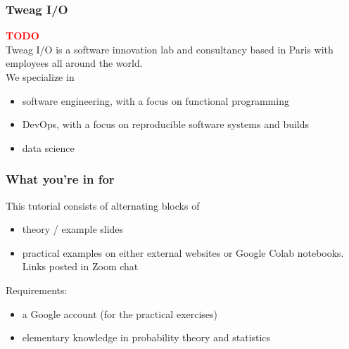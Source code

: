 \documentclass[t,aspectratio=169]{beamer}
\newcommand{\todo}{\textcolor{red}{\textbf{TODO}}}
\begin{document}
\begin{frame}
  \frametitle{Tweag I/O}
  \todo \\
  Tweag I/O is a software innovation lab and consultancy based in Paris with employees all around the world.\\
  We specialize in
  \begin{itemize}
  \item software engineering, with a focus on functional programming
  \item DevOps, with a focus on reproducible software systems and builds
  \item data science
  \end{itemize}
\end{frame}


\begin{frame}
  \frametitle{What you're in for}
  This tutorial consists of alternating blocks of
  \begin{itemize}
  \item theory / example slides
  \item practical examples on either external websites or Google Colab notebooks. Links posted in Zoom chat
  \end{itemize}

  Requirements:
  \begin{itemize}
  \item a Google account (for the practical exercises)
  \item elementary knowledge in probability theory and statistics
  \end{itemize}
\end{frame}




\end{document}
